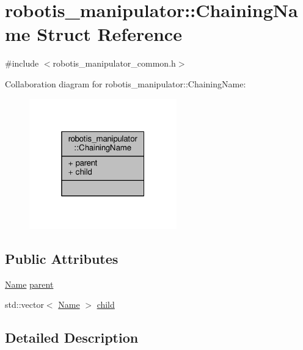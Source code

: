\hypertarget{structrobotis__manipulator_1_1_chaining_name}{}\section{robotis\+\_\+manipulator\+:\+:Chaining\+Name Struct Reference}
\label{structrobotis__manipulator_1_1_chaining_name}


{\ttfamily \#include $<$robotis\+\_\+manipulator\+\_\+common.\+h$>$}



Collaboration diagram for robotis\+\_\+manipulator\+:\+:Chaining\+Name\+:\nopagebreak
\begin{figure}[H]
\begin{center}
\leavevmode
\includegraphics[width=181pt]{structrobotis__manipulator_1_1_chaining_name__coll__graph}
\end{center}
\end{figure}
\subsection*{Public Attributes}
\begin{DoxyCompactItemize}
\item 
\hyperlink{namespacerobotis__manipulator_a08c2d25e77a01ad75b9bb740f8ce4765}{Name} \hyperlink{structrobotis__manipulator_1_1_chaining_name_aa5e92a4939b2884e63bee3690f387627}{parent}
\item 
std\+::vector$<$ \hyperlink{namespacerobotis__manipulator_a08c2d25e77a01ad75b9bb740f8ce4765}{Name} $>$ \hyperlink{structrobotis__manipulator_1_1_chaining_name_a600be40420b93d2d8596d07d7e36fbf2}{child}
\end{DoxyCompactItemize}


\subsection{Detailed Description}


